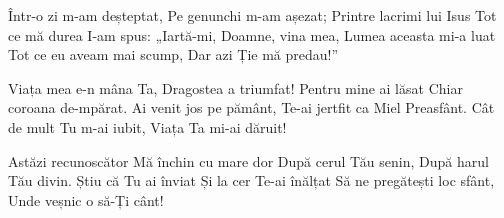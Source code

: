 \beginverse
Într-o zi m-am deșteptat,
Pe genunchi m-am așezat;
Printre lacrimi lui Isus
Tot ce mă durea I-am spus:
„Iartă-mi, Doamne, vina mea,
Lumea aceasta mi-a luat
Tot ce eu aveam mai scump,
Dar azi Ție mă predau!”
\endverse

\beginchorus
Viața mea e-n mâna Ta,
Dragostea a triumfat!
Pentru mine ai lăsat
Chiar coroana de-mpărat.
Ai venit jos pe pământ,
Te-ai jertfit ca Miel Preasfânt.
Cât de mult Tu m-ai iubit,
Viața Ta mi-ai dăruit!
\endchorus

\beginverse
Astăzi recunoscător
Mă închin cu mare dor
După cerul Tău senin,
După harul Tău divin.
Știu că Tu ai înviat
Și la cer Te-ai înălțat
Să ne pregătești loc sfânt,
Unde veșnic o să-Ți cânt!
\endverse
\endsong